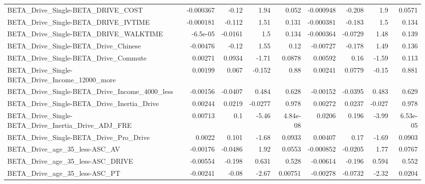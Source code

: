 \begin{tabular}{lrrrrrrrr}
BETA\_Drive\_Single-BETA\_DRIVE\_COST                  &   -0.000367 &        -0.12 &     1.94 &    0.052 &  -0.000948 &      -0.208 &          1.9 &        0.0571 \\
BETA\_Drive\_Single-BETA\_DRIVE\_IVTIME                &   -0.000181 &       -0.112 &     1.51 &    0.131 &  -0.000381 &      -0.183 &          1.5 &         0.134 \\
BETA\_Drive\_Single-BETA\_DRIVE\_WALKTIME              &    -6.5e-05 &      -0.0161 &      1.5 &    0.134 &  -0.000364 &     -0.0729 &         1.48 &         0.139 \\
BETA\_Drive\_Single-BETA\_Drive\_Chinese               &    -0.00476 &        -0.12 &     1.55 &     0.12 &   -0.00727 &      -0.178 &         1.49 &         0.136 \\
BETA\_Drive\_Single-BETA\_Drive\_Commute               &     0.00271 &       0.0934 &    -1.71 &   0.0878 &    0.00592 &        0.16 &        -1.59 &         0.113 \\
BETA\_Drive\_Single-BETA\_Drive\_Income\_12000\_more     &     0.00199 &        0.067 &   -0.152 &     0.88 &    0.00241 &      0.0779 &        -0.15 &         0.881 \\
BETA\_Drive\_Single-BETA\_Drive\_Income\_4000\_less      &    -0.00156 &      -0.0407 &    0.484 &    0.628 &   -0.00152 &     -0.0395 &        0.483 &         0.629 \\
BETA\_Drive\_Single-BETA\_Drive\_Inertia\_Drive         &     0.00244 &       0.0219 &  -0.0277 &    0.978 &    0.00272 &      0.0237 &       -0.027 &         0.978 \\
BETA\_Drive\_Single-BETA\_Drive\_Inertia\_Drive\_ADJ\_FRE &     0.00713 &          0.1 &    -5.46 & 4.84e-08 &     0.0206 &       0.196 &        -3.99 &      6.53e-05 \\
BETA\_Drive\_Single-BETA\_Drive\_Pro\_Drive             &      0.0022 &        0.101 &    -1.68 &   0.0933 &    0.00407 &        0.17 &        -1.69 &        0.0903 \\
BETA\_Drive\_age\_35\_less-ASC\_AV                      &    -0.00176 &      -0.0486 &     1.92 &   0.0553 &  -0.000852 &     -0.0205 &         1.77 &        0.0767 \\
BETA\_Drive\_age\_35\_less-ASC\_DRIVE                   &    -0.00554 &       -0.198 &    0.631 &    0.528 &   -0.00614 &      -0.196 &        0.594 &         0.552 \\
BETA\_Drive\_age\_35\_less-ASC\_PT                      &    -0.00241 &        -0.08 &    -2.67 &  0.00751 &   -0.00278 &     -0.0732 &        -2.32 &        0.0204 \\

\end{tabular}
